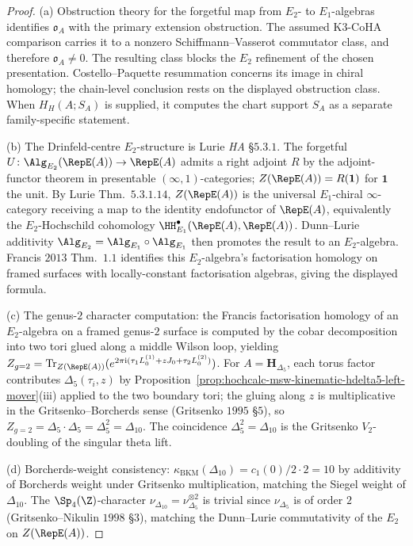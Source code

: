 \begin{proof}
(a) Obstruction theory for the forgetful map from $E_2$- to
$E_1$-algebras identifies $\mathfrak o_A$ with the primary extension
obstruction. The assumed K3-CoHA comparison carries it to a nonzero
Schiffmann--Vasserot commutator class, and therefore
$\mathfrak o_A\neq 0$. The resulting class blocks the $E_2$ refinement
of the chosen presentation. Costello--Paquette resummation concerns
its image in chiral homology; the chain-level conclusion rests on the
displayed obstruction class. When $H_H(A;S_A)$ is supplied,
it computes the chart support $S_A$ as a separate family-specific
statement.

(b) The Drinfeld-centre $E_2$-structure is Lurie \emph{HA} \S$5.3.1$.
The forgetful $U\colon\Alg_{E_2}(\RepE(A))\to\RepE(A)$ admits a
right adjoint $R$ by the adjoint-functor theorem in presentable
$(\infty,1)$-categories; $Z(\RepE(A))=R(\mathbf 1)$ for $\mathbf 1$
the unit. By Lurie Thm.\ $5.3.1.14$, $Z(\RepE(A))$ is the
universal $E_1$-chiral $\infty$-category receiving a map to the
identity endofunctor of $\RepE(A)$, equivalently the $E_2$-Hochschild
cohomology $\HH^\bullet_{E_1}(\RepE(A),\RepE(A))$. Dunn--Lurie
additivity $\Alg_{E_2}=\Alg_{E_1}\circ\Alg_{E_1}$ then promotes the
result to an $E_2$-algebra. Francis $2013$ Thm.\ $1.1$ identifies
this $E_2$-algebra's factorisation homology on framed surfaces with
locally-constant factorisation algebras, giving the displayed formula.

(c) The genus-$2$ character computation: the Francis factorisation
homology of an $E_2$-algebra on a framed genus-$2$ surface is
computed by the cobar decomposition into two tori glued along a
middle Wilson loop, yielding
$Z_{g=2}=\mathrm{Tr}_{Z(\RepE(A))}(e^{2\pi\mathrm i(\tau_1 L_0^{(1)}+zJ_0+\tau_2 L_0^{(2)})})$.
For $A=\mathbf H_{\Delta_5}$, each torus factor contributes
$\Delta_5(\tau_i,z)$ by
Proposition~\ref{prop:hochcalc-msw-kinematic-hdelta5-left-mover}(iii)
applied to the two boundary tori; the gluing along $z$ is multiplicative
in the Gritsenko--Borcherds sense (Gritsenko $1995$ \S$5$), so
$Z_{g=2}=\Delta_5\cdot\Delta_5=\Delta_5^2=\Delta_{10}$. The coincidence
$\Delta_5^2=\Delta_{10}$ is the Gritsenko $V_2$-doubling of the
singular theta lift.

(d) Borcherds-weight consistency: $\kappa_{\mathrm{BKM}}(\Delta_{10})=c_1(0)/2\cdot 2=10$
by additivity of Borcherds weight under Gritsenko multiplication,
matching the Siegel weight of $\Delta_{10}$. The $\Sp_4(\Z)$-character
$\nu_{\Delta_{10}}=\nu_{\Delta_5}^{\otimes 2}$ is trivial since
$\nu_{\Delta_5}$ is of order $2$ (Gritsenko--Nikulin $1998$ \S$3$),
matching the Dunn--Lurie commutativity of the $E_2$ on $Z(\RepE(A))$.
\end{proof}

